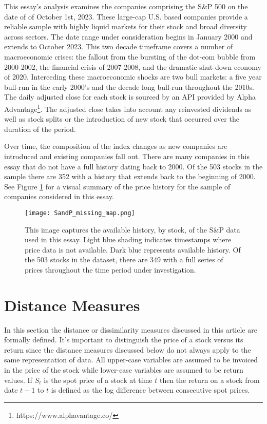 \documentclass[12pt]{report}
\begin{document}
This essay's analysis examines the companies comprising the S\&P 500 on the date of of October 1st, 2023. These large-cap U.S. based companies provide a reliable sample with highly liquid markets for their stock and broad diversity across sectors. The date range under consideration begins in January 2000 and extends to October 2023. This two decade timeframe covers a number of macroeconomic crises: the fallout from the bursting of the dot-com bubble from 2000-2002, the financial crisis of 2007-2008, and the dramatic shut-down economy of 2020. Interceding these macroeconomic shocks are two bull markets: a five year bull-run in the early 2000's and the decade long bull-run throughout the 2010s. The daily adjusted close for each stock is sourced by an API provided by Alpha Advantage\footnote{https://www.alphavantage.co/}. The adjusted close takes into account any reinvested dividends as well as stock splits or the introduction of new stock that occurred over the duration of the period.

Over time, the composition of the index changes as new companies are introduced and existing companies fall out. There are many companies in this essay that do not have a full history dating back to 2000. Of the 503 stocks in the sample there are 352 with a history that extends back to the beginning of 2000. See Figure \ref{fig:SandP_missing_map} for a visual summary of the price history for the sample of companies considered in this essay.

\begin{figure}
    \centering
    \texttt{[image: SandP\_missing\_map.png]}
    \caption{This image captures the available history, by stock, of the S\&P data used in this essay. Light blue shading indicates timestamps where price data is not available. Dark blue represents available history. Of the 503 stocks in the dataset, there are 349 with a full series of prices throughout the time period under investigation.}
    \label{fig:SandP_missing_map}
\end{figure}

\chapter{Distance Measures} \label{sec:Distance_Measures}

In this section the distance or dissimilarity measures discussed in this article are formally defined. It's important to distinguish the price of a stock versus its return since the distance measures discussed below do not always apply to the same representation of data. All upper-case variables are assumed to be invoiced in the price of the stock while lower-case variables are assumed to be return values. If $S_{t}$ is the spot price of a stock at time $t$ then the return on a stock from date $t-1$ to $t$ is defined as the log difference between consecutive spot prices.
\end{document}
